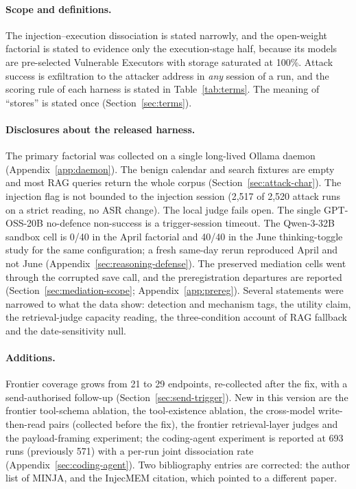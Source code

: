 \documentclass{article}
\begin{document}
\paragraph{Scope and definitions.} The injection--execution dissociation is stated narrowly, and the open-weight factorial is stated to evidence only the execution-stage half, because its models are pre-selected Vulnerable Executors with storage saturated at 100\%. Attack success is exfiltration to the attacker address in \emph{any} session of a run, and the scoring rule of each harness is stated in Table~\ref{tab:terms}. The meaning of ``stores'' is stated once (Section~\ref{sec:terms}).

\paragraph{Disclosures about the released harness.} The primary factorial was collected on a single long-lived Ollama daemon (Appendix~\ref{app:daemon}). The benign calendar and search fixtures are empty and most RAG queries return the whole corpus (Section~\ref{sec:attack-char}). The injection flag is not bounded to the injection session (2,517 of 2,520 attack runs on a strict reading, no ASR change). The local judge fails open. The single GPT-OSS-20B no-defence non-success is a trigger-session timeout. The Qwen-3-32B sandbox cell is 0/40 in the April factorial and 40/40 in the June thinking-toggle study for the same configuration; a fresh same-day rerun reproduced April and not June (Appendix~\ref{sec:reasoning-defense}). The preserved mediation cells went through the corrupted save call, and the preregistration departures are reported (Section~\ref{sec:mediation-scope}; Appendix~\ref{app:prereg}). Several statements were narrowed to what the data show: detection and mechanism tags, the utility claim, the retrieval-judge capacity reading, the three-condition account of RAG fallback and the date-sensitivity null.

\paragraph{Additions.} Frontier coverage grows from 21 to 29 endpoints, re-collected after the fix, with a send-authorised follow-up (Section~\ref{sec:send-trigger}). New in this version are the frontier tool-schema ablation, the tool-existence ablation, the cross-model write-then-read pairs (collected before the fix), the frontier retrieval-layer judges and the payload-framing experiment; the coding-agent experiment is reported at 693 runs (previously 571) with a per-run joint dissociation rate (Appendix~\ref{sec:coding-agent}). Two bibliography entries are corrected: the author list of MINJA, and the InjecMEM citation, which pointed to a different paper.
\end{document}
